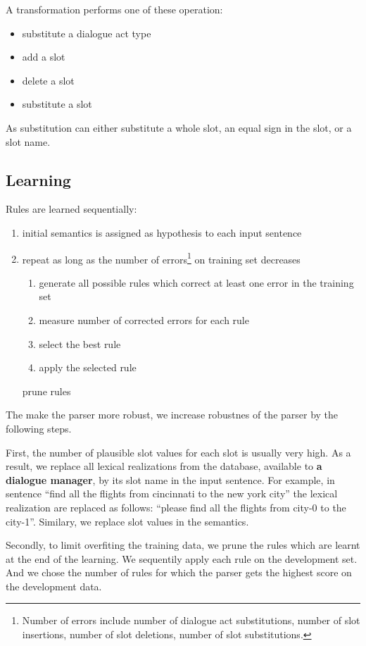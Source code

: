 \documentclass[11pt]{article}
\begin{document}
A transformation performs one of these operation:
\begin{itemize}
  \item substitute a dialogue act type
  \item add a slot
  \item delete a slot
  \item substitute a slot
\end{itemize}
As substitution can either substitute a whole slot, an equal sign in the slot, or a slot name.

\subsection{Learning}

Rules are learned sequentially:
\begin{enumerate}
  \item initial semantics is assigned as hypothesis to each input sentence
  \item repeat as long as the number of errors\footnote{Number of errors include number of dialogue act substitutions, number of slot insertions, number of slot deletions, number of slot substitutions.} on training set decreases
  \begin{enumerate}
    \item generate all possible rules which correct at least one error in the training set
    \item measure number of corrected errors for each rule
    \item select the best rule
    \item apply the selected rule
  \end{enumerate}
  \time prune rules
\end{enumerate}

The make the parser more robust, we increase robustnes of the parser by the following steps. 

First, the number of plausible slot values for each slot is usually very high. As a result, we replace all lexical realizations from the database, available to \textbf{a dialogue manager}, by its slot name in the input sentence. For example, in sentence ``find all the flights from cincinnati to the new york city'' the lexical realization are replaced as follows: ``please find all the flights from city-0 to the city-1''. Similary, we replace slot values in the semantics.

Secondly, to limit overfiting the training data, we prune the rules which are learnt at the end of the learning. We sequentily apply each rule on the development set. And we chose the number of rules for which the parser gets the highest score on the development data.
\end{document}
